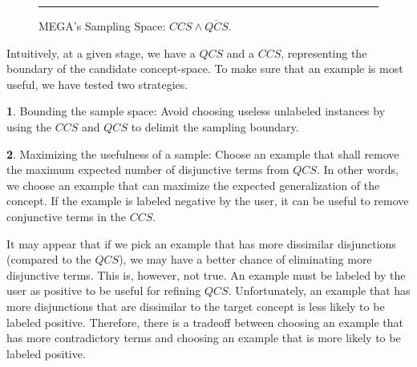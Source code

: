 \begin{figure}
\epsfysize=90pt
\centerline{}
\vspace{-.1in}
\caption{MEGA's Sampling Space: $CCS \wedge \overline{QCS}$.}
\vspace{-.1in}
\label{fig-qccs}
\vspace*{-2ex}
\rule{3.5in}{0.3mm}
\vspace*{-1.5ex}
\end{figure}
                 
Intuitively, at a given stage, we have a $QCS$ and
a $CCS$, representing the boundary of the candidate
concept-space.
To make sure that an example is most useful, we have tested two strategies.
\begin{nlist}
\item {\bf 1}. Bounding the sample space:
Avoid choosing useless unlabeled instances by using
the $CCS$ and $QCS$ to delimit the sampling boundary.
\item {\bf 2}. Maximizing the usefulness of a sample:
Choose an example that
shall remove the maximum expected number of disjunctive
terms from $QCS$. In other words, we choose an example
that can maximize the expected generalization of the concept.
If the example is labeled negative by the user, it can
be useful to remove conjunctive terms in the $CCS$.
\end{nlist}
               
It may appear that
if we pick an example that has more dissimilar
disjunctions (compared to the $QCS$), we may have
a better chance of eliminating more disjunctive terms.
This is, however, not true.
An example must be labeled by the user as positive to be
useful for refining $QCS$. Unfortunately, an example that has
more disjunctions that are dissimilar
to the target concept is less likely to be
labeled positive.  Therefore, there is a tradeoff
between choosing an example that has more contradictory
terms and choosing an example that is more likely
to be labeled positive.
                          
